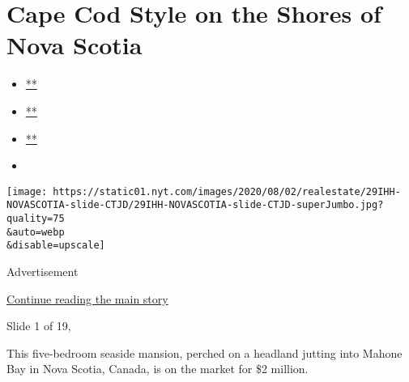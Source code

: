 \hypertarget{cape-cod-style-on-the-shores-of-nova-scotia}{%
\section{Cape Cod Style on the Shores of Nova
Scotia}\label{cape-cod-style-on-the-shores-of-nova-scotia}}

\begin{itemize}
\item
  \href{https://www.facebook.com/sharer.php?app_id=9869919170\&u=https\%3A\%2F\%2Fwww.nytimes.com\%2Fslideshow\%2F2020\%2F07\%2F29\%2Frealestate\%2Fcape-cod-style-on-the-shores-of-nova-scotia.html\%3Fsmid\%3Dfb-share\&name=Cape\%20Cod\%20Style\%20on\%20the\%20Shores\%20of\%20Nova\%20Scotia\&redirect_uri=https\%3A\%2F\%2Fwww.facebook.com\%2F}{**}
\item
  \href{https://twitter.com/intent/tweet?url=https\%3A\%2F\%2Fwww.nytimes.com\%2Fslideshow\%2F2020\%2F07\%2F29\%2Frealestate\%2Fcape-cod-style-on-the-shores-of-nova-scotia.html\%3Fsmid\%3Dtw-share\&text=Cape\%20Cod\%20Style\%20on\%20the\%20Shores\%20of\%20Nova\%20Scotia}{**}
\item
  \href{mailto:?subject=NYTimes.com\%3A\%20Cape\%20Cod\%20Style\%20on\%20the\%20Shores\%20of\%20Nova\%20Scotia\&body=From\%20The\%20New\%20York\%20Times\%3A\%0A\%0ACape\%20Cod\%20Style\%20on\%20the\%20Shores\%20of\%20Nova\%20Scotia\%0A\%0AThis\%20five-bedroom\%20seaside\%20mansion\%2C\%20perched\%20on\%20a\%20headland\%20jutting\%20into\%20Mahone\%20Bay\%20in\%20Nova\%20Scotia\%2C\%20Canada\%2C\%20is\%20on\%20the\%20market\%20for\%20\%242\%20million.\%0A\%0Ahttps\%3A\%2F\%2Fwww.nytimes.com\%2Fslideshow\%2F2020\%2F07\%2F29\%2Frealestate\%2Fcape-cod-style-on-the-shores-of-nova-scotia.html\%3Fsmid\%3Dem-share}{**}
\item
\end{itemize}

\texttt{[image: https://static01.nyt.com/images/2020/08/02/realestate/29IHH-NOVASCOTIA-slide-CTJD/29IHH-NOVASCOTIA-slide-CTJD-superJumbo.jpg?quality=75\\\&auto=webp\\\&disable=upscale]}

Advertisement

\protect\hyperlink{after-right-0}{Continue reading the main story}

Slide 1 of 19,

This five-bedroom seaside mansion, perched on a headland jutting into
Mahone Bay in Nova Scotia, Canada, is on the market for \$2 million.

~

